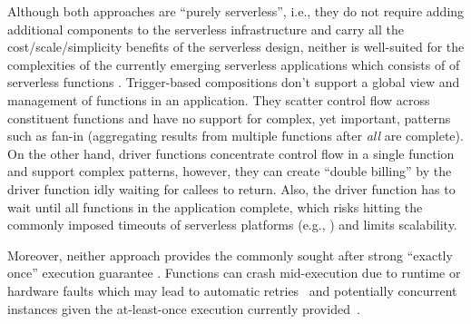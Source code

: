 Although both approaches are ``purely serverless'', i.e., they do not require adding
additional components to the serverless infrastructure and carry all the cost/scale/simplicity benefits of the serverless design, neither is well-suited for the  complexities of the currently emerging serverless applications which consists of  of serverless functions . 
Trigger-based compositions don't support a global view and management of functions in an application.  They scatter control flow across constituent functions and have no support for complex, yet important, patterns such as fan-in (aggregating results from multiple functions after \textit{all} are complete). 
On the other hand, driver functions concentrate control
flow in a single function and support complex patterns, however, they can  create ``double billing'' by the driver function idly 
waiting for callees to return. Also, the driver function has to wait until all
functions in the application complete, which risks hitting the commonly imposed timeouts of serverless platforms (e.g., ) and limits scalability. 


Moreover, neither approach provides the commonly sought after strong  ``exactly once'' execution guarantee .  Functions can crash mid-execution due to runtime
or hardware faults which may lead to automatic retries~\cite{aws-lambda-retry,
	azure-functions-retry} and potentially concurrent instances given the at-least-once execution currently provided~\cite{aws-lambda-async-invoke,
	azure-functions-exec-guarantee}. 

 





